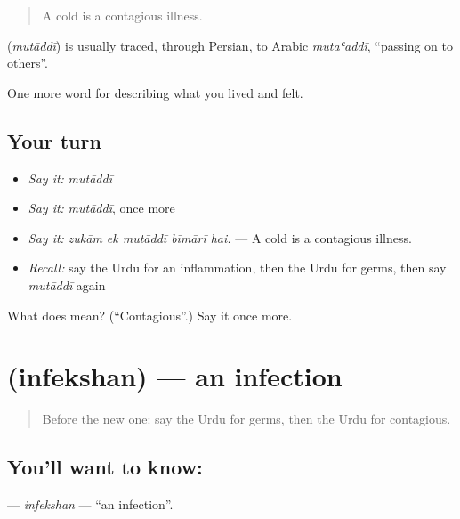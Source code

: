 \begin{quote}
A cold is a contagious illness.
\end{quote}

\begin{cousinweb}
\textbf{} (\emph{mutāddī}) is usually traced, through Persian, to Arabic \emph{mutaʿaddī}, \textquotedblleft{}passing on to others\textquotedblright{}.
\end{cousinweb}

\begin{grammarlens}[title={What you've built}]
One more word for describing what you lived and felt.
\end{grammarlens}

\subsection*{Your turn}
\begin{itemize}
\raggedright
  \item \emph{Say it:} \emph{mutāddī}
  \item \emph{Say it:} \emph{mutāddī}, once more
  \item \emph{Say it:} \emph{zukām ek mutāddī bīmārī hai.} — A cold is a contagious illness.
  \item \emph{Recall:} say the Urdu for an inflammation, then the Urdu for germs, then say \emph{mutāddī} again
\end{itemize}

\begin{tcolorbox}[breakable,colback=teal!4,colframe=teal!35!black,title={Before you move on}]
What does  mean? (\textquotedblleft{}Contagious\textquotedblright{}.) Say it once more.
\end{tcolorbox}
\section[\texorpdfstring{\ur{انفیکشن} (infekshan)}{انفیکشن (infekshan)}]{ (infekshan) — an infection}

\label{lesson:UR-C474-infekshan}



\begin{quote}
Before the new one: say the Urdu for germs, then the Urdu for contagious.
\end{quote}

\subsection*{You'll want to know: }
\textbf{} — \emph{infekshan} — \textquotedblleft{}an infection\textquotedblright{}.

